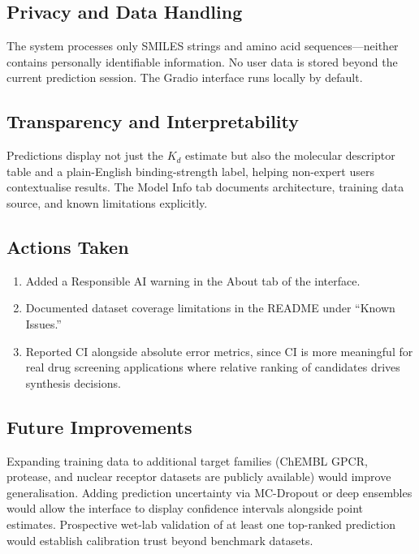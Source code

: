 \documentclass[conference]{IEEEtran}
\begin{document}
\subsection{Privacy and Data Handling}

The system processes only SMILES strings and amino acid sequences---neither
contains personally identifiable information. No user data is stored beyond
the current prediction session. The Gradio interface runs locally by default.

\subsection{Transparency and Interpretability}

Predictions display not just the $K_d$ estimate but also the molecular
descriptor table and a plain-English binding-strength label, helping
non-expert users contextualise results. The Model Info tab documents
architecture, training data source, and known limitations explicitly.

\subsection{Actions Taken}

\begin{enumerate}
  \item Added a Responsible AI warning in the About tab of the interface.
  \item Documented dataset coverage limitations in the README under
        ``Known Issues.''
  \item Reported CI alongside absolute error metrics, since CI is more
        meaningful for real drug screening applications where relative ranking
        of candidates drives synthesis decisions.
\end{enumerate}

\subsection{Future Improvements}

Expanding training data to additional target families (ChEMBL GPCR, protease,
and nuclear receptor datasets are publicly available) would improve
generalisation. Adding prediction uncertainty via MC-Dropout or deep ensembles
would allow the interface to display confidence intervals alongside point
estimates. Prospective wet-lab validation of at least one top-ranked
prediction would establish calibration trust beyond benchmark datasets.
\end{document}
